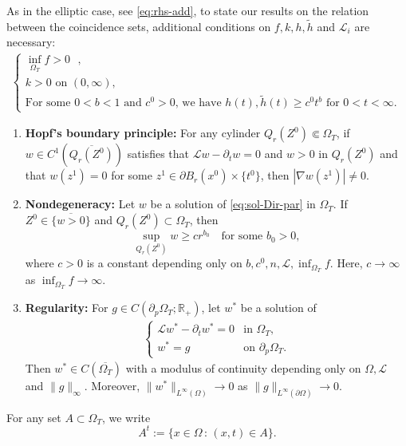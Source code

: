 \documentclass[11pt,oneside,english]{amsart}
\newcommand{\R}{{\mathbb R}}
\newcommand{\cL}{{\mathcal L}}
\newcommand{\D}{\nabla}
\numberwithin{equation}{section}
\theoremstyle{plain}
\numberwithin{equation}{section}
\begin{document}
As in the elliptic case, see \eqref{eq:rhs-add},
to state our results on the relation between the coincidence sets, additional conditions on $f,k,h,\tilde h$ and $\cL_i$ are necessary:
\begin{align}
    \label{eq:rhs-add-par}
    \begin{cases}
        \text{$\inf_{\Omega_T} f>0$  },\\
        \text{$k>0$ on $(0,\infty)$, }\\
        \text{For some $0<b<1$ and $c^0>0$, we have $h(t),\tilde h(t)\ge c^0t^b$ for $0<t<\infty$.   }
    \end{cases}
\end{align}
\begin{enumerate}[label={\bf (PP\arabic*')}]
    \item\label{cond-Hopf-par} {\bf Hopf's boundary principle:} For any cylinder $Q_r(Z^0)\Subset \Omega_T$, if $w\in C^1(\overline{Q_r(Z^0)})$ satisfies that $\cL w-\partial_tw=0$ and $w>0$ in $Q_r(Z^0)$ and that $w(z^1)=0$ for some $z^1\in \partial B_r(x^0)\times\{t^0\}$, then $|\D w(z^1)|\neq0$.
    \item\label{cond-nondeg-par}{\bf Nondegeneracy:} Let $w$ be a solution of \eqref{eq:sol-Dir-par} in $\Omega_T$. If $Z^0\in \overline{\{w>0\}}$ and $Q_r(Z^0)\subset\Omega_T$, then
    $$
    \sup_{Q_r(Z^0)}w\ge cr^{b_0} \quad\text{for some }b_0>0,
    $$
    where $c>0$ is a constant depending only on $b,c^0,n,\cL,\inf_{\Omega_T} f$. Here, $c\to\infty$ as $\inf_{\Omega_T} f\to\infty$.
\item\label{cond-conv-2-par}{\bf Regularity:} For $g\in C(\partial_p\Omega_T;\R_+)$, let $w^*$ be a solution of 
\begin{align*}
    \begin{cases}
        \cL w^*-\partial_tw^*=0&\text{in }\Omega_T,\\
        w^*=g&\text{on }\partial_p\Omega_T.
    \end{cases}
\end{align*}
    Then $w^*\in C(\overline{\Omega_T})$ with a modulus of continuity depending only on $\Omega,\cL$ and $\|g\|_\infty$. Moreover,  $\|w^*\|_{L^\infty(\Omega)}\to0$ as $\|g\|_{L^\infty(\partial\Omega)}\to0$.
\end{enumerate}

For any set $A\subset \Omega_T$, we write
$$
A^t:=\{x\in\Omega\,:\, (x,t)\in A\}.
$$
\end{document}
